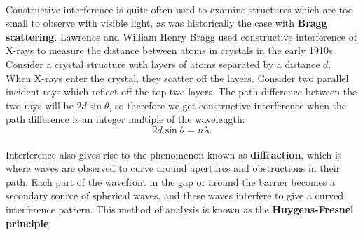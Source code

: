 \documentclass[../classical_mechanics.tex]{subfiles}
\begin{document}
        \paragraph{}
        Constructive interference is quite often used to examine structures which are too small to observe with visible light, as was historically the case with \textbf{Bragg scattering}.
        Lawrence and William Henry Bragg used constructive interference of X-rays to measure the distance between atoms in crystals in the early 1910s.
        Consider a crystal structure with layers of atoms separated by a distance $d$.
        When X-rays enter the crystal, they scatter off the layers.
        Consider two parallel incident rays which reflect off the top two layers.
        The path difference between the two rays will be $2d\sin\theta$, so therefore we get constructive interference when the path difference is an integer multiple of the wavelength:
        \begin{equation}
            2d\sin\theta=n\lambda.
        \end{equation}

        \paragraph{}
        Interference also gives rise to the phenomenon known as \textbf{diffraction}, which is where waves are observed to curve around apertures and obstructions in their path.
        Each part of the wavefront in the gap or around the barrier becomes a secondary source of spherical waves, and these waves interfere to give a curved interference pattern.
        This method of analysis is known as the \textbf{Huygens-Fresnel principle}.
\end{document}
